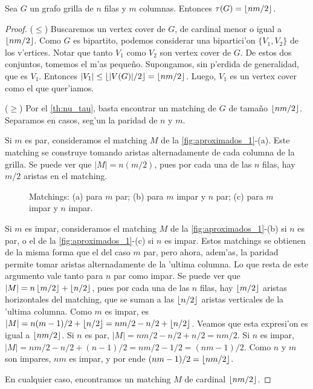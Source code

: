 \begin{theorem}
\label{th:tau_grilla}
Sea $G$ un grafo grilla de $n$ filas y $m$ columnas. Entonces $\tau(G) = \left\lfloor nm / 2 \right\rfloor$.

\begin{proof}
($\leq$) Buscaremos un vertex cover de $G$, de cardinal menor o igual a $\left\lfloor nm / 2 \right\rfloor$. Como $G$ es bipartito, podemos considerar una bipartici'on $\{V_1, V_2\}$ de los v'ertices. Notar que tanto $V_1$ como $V_2$ son vertex cover de $G$. De estos dos conjuntos, tomemos el m'as peque\~no. Supongamos, sin p'erdida de generalidad, que es $V_1$. Entonces $|V_1| \leq \left\lfloor |V(G)| / 2 \right\rfloor = \left\lfloor nm / 2 \right\rfloor$. Luego, $V_1$ es un vertex cover como el que quer'iamos.

($\geq$) Por el \autoref{th:nu_tau}, basta encontrar un matching de $G$ de tama\~no $\left\lfloor nm / 2 \right\rfloor$. Separamos en casos, seg'un la paridad de $n$ y $m$.

Si $m$ es par, consideramos el matching $M$ de la \autoref{fig:aproximados_1}-(a). Este matching se construye tomando aristas alternadamente de cada columna de la grilla. Se puede ver que $|M| = n (m / 2)$, pues por cada una de las $n$ filas, hay $m / 2$ aristas en el matching.

\begin{figure}[h]
	\begin{center}
		
	\end{center}		
	\caption{Matchings: (a) para $m$ par; (b) para $m$ impar y $n$ par; (c) para $m$ impar y $n$ impar.}
	\label{fig:aproximados_1}
\end{figure}

Si $m$ es impar, consideramos el matching $M$ de la \autoref{fig:aproximados_1}-(b) si $n$ es par, o el de la \autoref{fig:aproximados_1}-(c) si $n$ es impar. Estos matchings se obtienen de la misma forma que el del caso $m$ par, pero ahora, adem'as, la paridad permite tomar aristas alternadamente de la 'ultima columna. Lo que resta de este argumento vale tanto para $n$ par como impar. Se puede ver que $|M| = n \left\lfloor m / 2 \right\rfloor + \left\lfloor n / 2 \right\rfloor$, pues por cada una de las $n$ filas, hay $\left\lfloor m / 2 \right\rfloor$ aristas horizontales del matching, que se suman a las $\left\lfloor n / 2 \right\rfloor$ aristas verticales de la 'ultima columna. Como $m$ es impar, es $|M| = n (m - 1) / 2 + \left\lfloor n / 2 \right\rfloor = nm / 2 - n / 2 + \left\lfloor n / 2 \right\rfloor$. Veamos que esta expresi'on es igual a $\left\lfloor nm / 2 \right\rfloor$. Si $n$ es par, $|M| = nm / 2 - n / 2 + n / 2 = nm / 2$. Si $n$ es impar, $|M| = nm / 2 - n / 2 + (n - 1) / 2 = nm / 2 - 1 / 2 = (nm - 1) / 2$. Como $n$ y $m$ son impares, $nm$ es impar, y por ende $(nm - 1) / 2 = \left\lfloor nm / 2 \right\rfloor$.

En cualquier caso, encontramos un matching $M$ de cardinal $\left\lfloor nm / 2 \right\rfloor$.

\end{proof}
\end{theorem}

